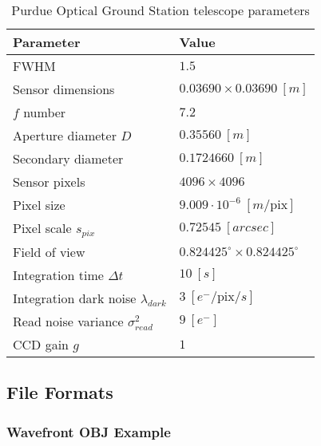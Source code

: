 \begin{table}[ht]
    \centering
    \begin{tabular}{|l|l|}
    \hline
    \textbf{Parameter} & \textbf{Value} \\ \hline
    FWHM                & $1.5$                              \\ \hline
    Sensor dimensions    & $ 0.03690 \times 0.03690 \: [m]$                               \\ \hline
    $f$ number   & $7.2$                              \\ \hline
    Aperture diameter $D$       & $0.35560 \: [m]$                              \\ \hline
    Secondary diameter         & $0.1724660 \: [m]$                              \\ \hline
    Sensor pixels               & $4096 \times 4096$                              \\ \hline
    Pixel size               & $9.009 \cdot 10^{-6} \: [m / \textrm{pix}]$                              \\ \hline
    Pixel scale $s_{pix}$              & $0.72545 \: [arcsec]$                              \\ \hline
    Field of view               & $0.824425^\circ \times 0.824425^\circ$                              \\ \hline
    Integration time $\Delta t$              & $10 \: [s]$                              \\ \hline
    Integration dark noise $\lambda_{dark}$ & $3 \: \left[ e^- / \mathrm{pix} / s\right]$ \\ \hline
    Read noise variance $\sigma_{read}^2$ & $9 \: \left[ e^- \right]$ \\ \hline
    CCD gain $g$ & $1$ \\ \hline
    \end{tabular}
    \caption{Purdue Optical Ground Station telescope parameters}
    \label{tb:pogs_parameters}
  \end{table}


\subsection{File Formats}

\subsubsection{Wavefront OBJ Example} \label{sec:obj_listing}

\begin{listing}[ht]
    \inputminted[breaklines=true, breakanywhere=true, breaksymbol=\hspace{0pt}, fontsize=\footnotesize]{text}{/Users/liamrobinson/Documents/PyLightCurves/mirage/resources/models/cube.obj}
\end{listing}